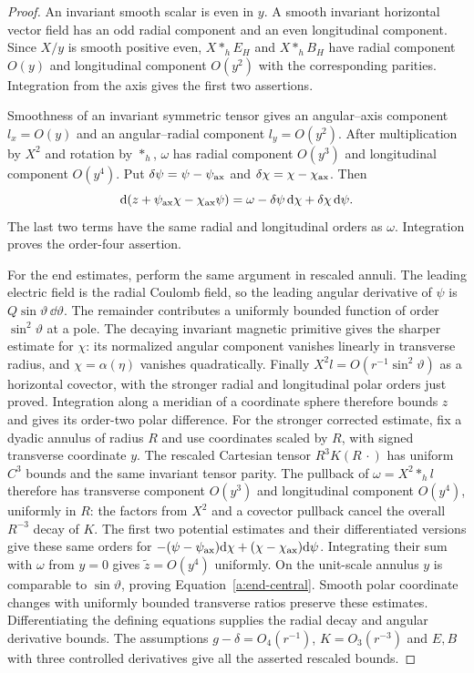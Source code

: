 \begin{proof}
An invariant smooth scalar is even in $y$.  A smooth invariant
horizontal vector field has an odd radial component and an even
longitudinal component.  Since $X/y$ is smooth positive even,
$X*_hE_H$ and $X*_hB_H$ have radial component $O(y)$ and
longitudinal component $O(y^2)$ with the corresponding parities.
Integration from the axis gives the first two assertions.

Smoothness of an invariant symmetric tensor gives an angular--axis
component $l_x=O(y)$ and an angular--radial component $l_y=O(y^2)$.
After multiplication by $X^2$ and rotation by $*_h$, $\omega$ has
radial component $O(y^3)$ and longitudinal component $O(y^4)$.
Put $\delta\psi=\psi-\psi_{\rm ax}$ and
$\delta\chi=\chi-\chi_{\rm ax}$.  Then
\[
 \mathrm d(z+\psi_{\rm ax}\chi-\chi_{\rm ax}\psi)
       =\omega-\delta\psi\,\mathrm d\chi
                    +\delta\chi\,\mathrm d\psi.
\]
The last two terms have the same radial and longitudinal orders as
$\omega$.  Integration proves the order-four assertion.

For the end estimates, perform the same argument in rescaled
annuli.  The leading electric field is the radial Coulomb field, so
the leading angular derivative of $\psi$ is
$Q\sin\vartheta\,\dd\vartheta$.  The remainder contributes a
uniformly bounded function of order $\sin^2\vartheta$ at a pole.
The decaying invariant magnetic primitive gives the sharper estimate
for $\chi$: its normalized angular component vanishes linearly in
transverse radius, and $\chi=\alpha(\eta)$ vanishes quadratically.
Finally $X^2l=O(r^{-1}\sin^2\vartheta)$ as a horizontal
covector, with the stronger radial and longitudinal polar orders
just proved.  Integration along a meridian of a coordinate sphere
therefore bounds $z$ and gives its order-two polar difference.
For the stronger corrected estimate, fix a dyadic annulus of radius
$R$ and use coordinates scaled by $R$, with signed transverse coordinate
$y$.  The rescaled Cartesian tensor $R^3K(R\,\cdot)$ has uniform $C^3$
bounds and the same invariant tensor parity.  The pullback of
$\omega=X^2*_hl$ therefore has transverse component $O(y^3)$ and
longitudinal component $O(y^4)$, uniformly in $R$: the factors from
$X^2$ and a covector pullback cancel the overall $R^{-3}$ decay of $K$.
The first two potential estimates and their differentiated versions give
these same orders for
$-(\psi-\psi_{\rm ax})\mathrm d\chi
 +(\chi-\chi_{\rm ax})\mathrm d\psi$.
Integrating their sum with $\omega$ from $y=0$ gives
$\widetilde z=O(y^4)$ uniformly.  On the unit-scale annulus
$y$ is comparable to $\sin\vartheta$, proving
Equation~\eqref{a:end-central}.  Smooth polar coordinate changes with
uniformly bounded transverse ratios preserve these estimates.
Differentiating the defining equations supplies the radial decay
and angular derivative bounds.  The assumptions $g-\delta=O_4(r^{-1})$,
$K=O_3(r^{-3})$ and $E,B$ with three controlled derivatives give
all the asserted rescaled bounds.
\end{proof}

